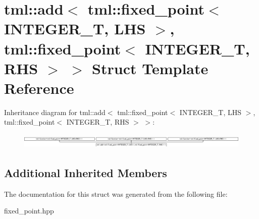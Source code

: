 \hypertarget{structtml_1_1add_3_01tml_1_1fixed__point_3_01INTEGER__T_00_01LHS_01_4_00_01tml_1_1fixed__point_3bf17901cc0efef9a957f2f698861be28}{\section{tml\+:\+:add$<$ tml\+:\+:fixed\+\_\+point$<$ I\+N\+T\+E\+G\+E\+R\+\_\+\+T, L\+H\+S $>$, tml\+:\+:fixed\+\_\+point$<$ I\+N\+T\+E\+G\+E\+R\+\_\+\+T, R\+H\+S $>$ $>$ Struct Template Reference}
\label{structtml_1_1add_3_01tml_1_1fixed__point_3_01INTEGER__T_00_01LHS_01_4_00_01tml_1_1fixed__point_3bf17901cc0efef9a957f2f698861be28}
}
Inheritance diagram for tml\+:\+:add$<$ tml\+:\+:fixed\+\_\+point$<$ I\+N\+T\+E\+G\+E\+R\+\_\+\+T, L\+H\+S $>$, tml\+:\+:fixed\+\_\+point$<$ I\+N\+T\+E\+G\+E\+R\+\_\+\+T, R\+H\+S $>$ $>$\+:\begin{figure}[H]
\begin{center}
\leavevmode
\includegraphics[height=0.737813cm]{structtml_1_1add_3_01tml_1_1fixed__point_3_01INTEGER__T_00_01LHS_01_4_00_01tml_1_1fixed__point_3bf17901cc0efef9a957f2f698861be28}
\end{center}
\end{figure}
\subsection*{Additional Inherited Members}


The documentation for this struct was generated from the following file\+:\begin{DoxyCompactItemize}
\item 
fixed\+\_\+point.\+hpp\end{DoxyCompactItemize}
